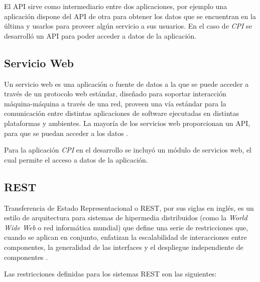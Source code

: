 El API sirve como intermediario entre dos aplicaciones, por ejemplo una aplicación dispone del API de otra para obtener los datos que se encuentran en la última y usarlos para proveer algún servicio a sus usuarios. En el caso de \textit{CPI} se desarrolló un API para poder acceder a datos de la aplicación.

\subsection{Servicio Web} \label{WebService}
Un servicio web es una aplicación o fuente de datos a la que se puede acceder a través de un protocolo web estándar, diseñado para soportar interacción máquina-máquina a través de una red, proveen una vía estándar para la comunicación entre distintas aplicaciones de software ejecutadas en distintas plataformas y ambientes. La mayoría de los servicios web proporcionan un API, para que se puedan acceder a los datos \cite{webServiceChristensson}.

Para la aplicación \textit{CPI} en el desarrollo se incluyó un módulo de servicios web, el cual permite el acceso a datos de la aplicación.

\subsection{REST}
Transferencia de Estado Representacional o REST, por sus siglas en inglés, es un estilo de arquitectura para sistemas de hipermedia distribuidos (como la \textit{World Wide Web} o red informática mundial) que define una serie de restricciones que, cuando se aplican en conjunto, enfatizan la escalabilidad de interacciones entre componentes, la generalidad de las interfaces y el despliegue independiente de componentes \cite{restFielding}.

Las restricciones definidas para los sistemas REST son las siguientes:

